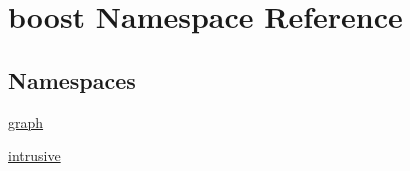 \hypertarget{namespaceboost}{}\section{boost Namespace Reference}
\label{namespaceboost}
\subsection*{Namespaces}
\begin{DoxyCompactItemize}
\item 
 \hyperlink{namespaceboost_1_1graph}{graph}
\item 
 \hyperlink{namespaceboost_1_1intrusive}{intrusive}
\end{DoxyCompactItemize}
